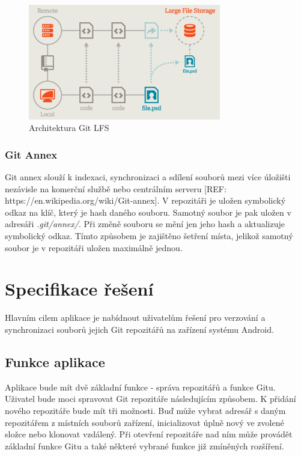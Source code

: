 \begin{figure}[h!]
    \centering
    \vspace{0.5cm}
    \includegraphics[width=0.75\textwidth,height=0.75\textheight,keepaspectratio]{obrazky-figures/git-lfs.pdf}
    \caption{Architektura Git LFS}
    \label{diagram:git-lfs}
\end{figure}

\subsection{Git Annex}
Git annex slouží k indexaci, synchronizaci a sdílení souborů mezi více úložišti nezávisle na komerční službě nebo centrálním serveru [REF: https://en.wikipedia.org/wiki/Git-annex]. V repozitáři je uložen symbolický odkaz na klíč, který je hash daného souboru. Samotný soubor je pak uložen v adresáři \emph{.git/annex/}. Při změně souboru se mění jen jeho hash a aktualizuje symbolický odkaz. Tímto způsobem je zajištěno šetření místa, jelikož samotný soubor je v repozitáři uložen maximálně jednou.

\chapter{Specifikace řešení}
Hlavním cilem aplikace je nabídnout uživatelům řešení pro verzování a synchronizaci souborů jejich Git repozitářů na zařízení systému Android.

\section{Funkce aplikace}
Aplikace bude mít dvě základní funkce - správa repozitářů a funkce Gitu. Uživatel bude moci spravovat Git repozitáře následujícím způsobem. K přidání nového repozitáře bude mít tři možnosti. Buď může vybrat adresář s daným repozitářem z místních souborů zařízení, inicializovat úplně nový ve zvolené složce nebo klonovat vzdálený. Při otevření repozitáře nad ním může provádět základní funkce Gitu a také některé vybrané funkce již zmíněných rozšíření.

